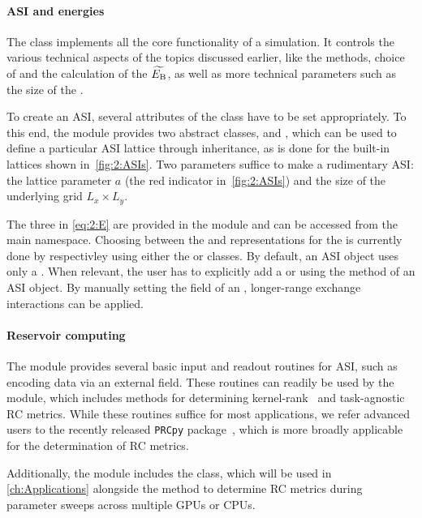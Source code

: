 \paragraph{ASI and energies}
The \textbf{} class implements all the core functionality of a simulation.
It controls the various technical aspects of the topics discussed earlier, like the  methods, choice of  and the calculation of the  $\widetilde{E_\mathrm{B}}$, as well as more technical parameters such as the size of the . \par
To create an ASI, several attributes of the  class have to be set appropriately.
To this end, the \textbf{} module provides two abstract classes,  and , which can be used to define a particular ASI lattice through inheritance, as is done for the built-in lattices shown in~\cref{fig:2:ASIs}.
Two parameters suffice to make a rudimentary ASI: the lattice parameter $a$ (the red indicator in~\cref{fig:2:ASIs}) and the size of the underlying grid $L_x \times L_y$. \par
The three  in \eqref{eq:2:E} are provided in the \textbf{} module and can be accessed from the main  namespace.
Choosing between the  and  representations for the  is currently done by respectivley using either the  or  classes.
By default, an ASI object uses only a .
When relevant, the user has to explicitly add a  or  using the  method of an ASI object.
By manually setting the  field of an , longer-range exchange interactions can be applied.

\paragraph{Reservoir computing} %
The  module provides several basic input and readout routines for ASI, such as encoding data via an external field.
These routines can readily be used by the  module, which includes methods for determining kernel-rank~\cite{RC_ASI} and task-agnostic~\cite{RC_TaskAgnosticMetrics_v2} RC metrics.
While these routines suffice for most applications, we refer advanced users to the recently released \texttt{PRCpy} package~\cite{PRCpy}, which is more broadly applicable for the determination of RC metrics. \par
Additionally, the  module includes the
 class, which will be used in \cref{ch:Applications} alongside the  method to determine RC metrics during parameter sweeps across multiple GPUs or CPUs.

